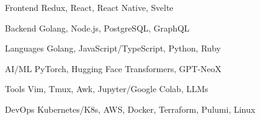

\begin{cvskills}
  \cvskill
    {Frontend} %
    {Redux, React, React Native, Svelte} %

  \cvskill
    {Backend} %
    {Golang, Node.js, PostgreSQL, GraphQL} %

  \cvskill
    {Languages} %
    {Golang, JavaScript/TypeScript, Python, Ruby} %

  \cvskill
    {AI/ML} %
    {PyTorch, Hugging Face Transformers, GPT-NeoX} %

  \cvskill
    {Tools} %
    {Vim, Tmux, Awk, Jupyter/Google Colab, LLMs} %

  \cvskill
    {DevOps} %
    {Kubernetes/K8s, AWS, Docker, Terraform, Pulumi, Linux} %


\end{cvskills}
